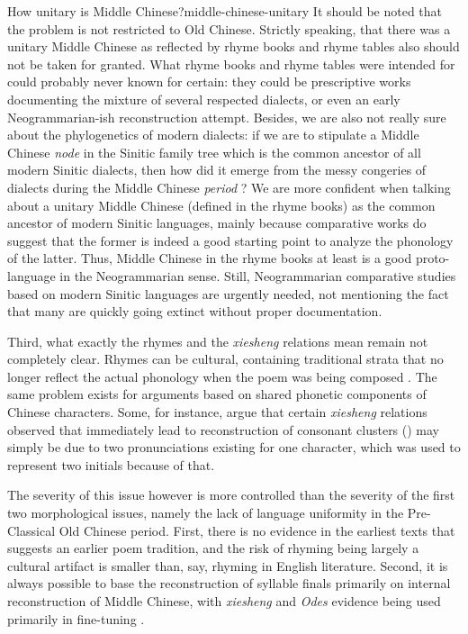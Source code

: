 \documentclass[UTF8, a4paper, oneside, scheme=plain, 12pt]{ctexrep}
\newcommand*{\citepage}[1]{p.~{#1}}
\newcommand*{\citepages}[1]{pp.~{#1}}
\newcommand{\form}[1]{\emph{#1}}
\newcommand{\work}[1]{\textit{#1}}
\begin{document}
\begin{infobox}{How unitary is Middle Chinese?}{middle-chinese-unitary}
    It should be noted that the problem is not restricted to Old Chinese.
    Strictly speaking, that there was a unitary Middle Chinese
    as reflected by rhyme books and rhyme tables also should not be taken for granted.
    What rhyme books and rhyme tables were intended for could probably never known for certain:
    they could be prescriptive works documenting the mixture of several respected dialects,
    or even an early Neogrammarian-ish reconstruction attempt.
    Besides, we are also not really sure about the phylogenetics of modern dialects:
    if we are to stipulate a Middle Chinese \emph{node} in the Sinitic family tree
    which is the common ancestor of all modern Sinitic dialects,
    then how did it emerge from the messy congeries of dialects during the Middle Chinese \emph{period} \citep[\citepages{477-478}]{harbsmeier2016irrefutable}?
    We are more confident when talking about a unitary Middle Chinese (defined in the rhyme books)
    as the common ancestor of modern Sinitic languages,
    mainly because comparative works do suggest that the former is indeed a good starting point to analyze the phonology of the latter.
    Thus, Middle Chinese in the rhyme books at least is a good proto-language in the Neogrammarian sense.
    Still, Neogrammarian comparative studies based on modern Sinitic languages are urgently needed,
    not mentioning the fact that many are quickly going extinct without proper documentation.
\end{infobox}

Third, what exactly the rhymes and the \form{xiesheng} relations mean remain not completely clear.
Rhymes can be cultural, containing traditional strata that no longer reflect the actual phonology when the poem was being composed
\citep[\citepages{454-455}]{harbsmeier2016irrefutable}.
The same problem exists for arguments based on shared phonetic components of Chinese characters.
Some, for instance, argue that certain \form{xiesheng} relations observed
that immediately lead to reconstruction of consonant clusters ()
may simply be due to two pronunciations existing for one character,
which was used to represent two initials because of that.

The severity of this issue however is more controlled than the severity of the first two morphological issues, namely the lack of language uniformity in the Pre-Classical Old Chinese period.
First, there is no evidence in the earliest texts that suggests an earlier poem tradition,
and the risk of rhyming being largely a cultural artifact is smaller than,
say, rhyming in English literature.
Second, it is always possible to base the reconstruction of syllable finals primarily on internal reconstruction of Middle Chinese,
with \form{xiesheng} and \work{Odes} evidence being used primarily in fine-tuning \citep[\citepage{188}]{hill2019historical}.
\end{document}
